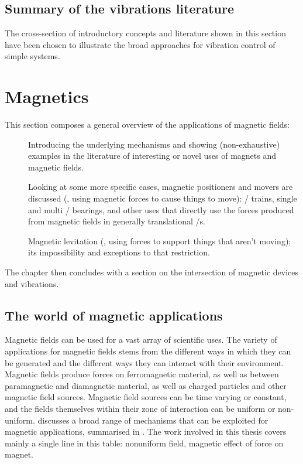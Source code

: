 \subsection{Summary of the vibrations literature}

The cross-section of introductory concepts and literature shown in this section have been chosen to illustrate the broad approaches for vibration control of simple systems.





\section{Magnetics}


This section composes a general overview of the applications of magnetic fields:
\begin{description}
\item[]
Introducing the underlying mechanisms and showing (non-exhaustive) examples in the literature of interesting or novel uses of magnets and magnetic fields.
\item[]
Looking at some more specific cases, magnetic positioners and movers are discussed (\ie, using magnetic forces to cause things to move): \maglev/ trains, single and multi \dof/ bearings, and other uses that directly use the forces produced from magnetic fields in generally translational \dof/s.
\item[]
Magnetic levitation (\ie, using forces to support things that aren't moving); its impossibility and exceptions to that restriction.
\end{description}
The chapter then concludes with a section on the intersection of magnetic devices and vibrations.



\subsection{The world of magnetic applications}

Magnetic fields can be used for a vast array of scientific uses.
The variety of applications for magnetic fields stems from the different ways in which they can be generated and the different ways they can interact with their environment.
Magnetic fields produce forces on ferromagnetic material, as well as between paramagnetic and diamagnetic material, as well as charged particles and other magnetic field sources. Magnetic field sources can be time varying or constant, and the fields themselves within their zone of interaction can be uniform or non-uniform.
\textcite{coey2002} discusses a broad range of mechanisms that can be exploited for magnetic applications, summarised in .
The work involved in this thesis covers mainly a single line in this table: nonuniform field, magnetic effect of force on magnet.


